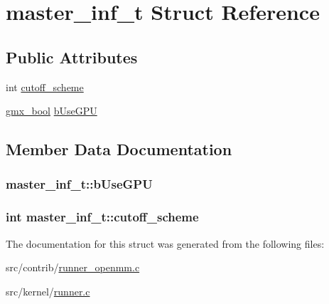 \hypertarget{structmaster__inf__t}{\section{master\-\_\-inf\-\_\-t \-Struct \-Reference}
\label{structmaster__inf__t}
}
\subsection*{\-Public \-Attributes}
\begin{DoxyCompactItemize}
\item 
int \hyperlink{structmaster__inf__t_a4c349071ca259b7096673adaf4b1058a}{cutoff\-\_\-scheme}
\item 
\hyperlink{include_2types_2simple_8h_a8fddad319f226e856400d190198d5151}{gmx\-\_\-bool} \hyperlink{structmaster__inf__t_ae53eec6d313a18c3a3f98839a1f177f1}{b\-Use\-G\-P\-U}
\end{DoxyCompactItemize}


\subsection{\-Member \-Data \-Documentation}
\hypertarget{structmaster__inf__t_ae53eec6d313a18c3a3f98839a1f177f1}{
\subsubsection[{b\-Use\-G\-P\-U}]{ {\bf master\-\_\-inf\-\_\-t\-::b\-Use\-G\-P\-U}}}\label{structmaster__inf__t_ae53eec6d313a18c3a3f98839a1f177f1}
\hypertarget{structmaster__inf__t_a4c349071ca259b7096673adaf4b1058a}{
\subsubsection[{cutoff\-\_\-scheme}]{\setlength{\rightskip}{0pt plus 5cm}int {\bf master\-\_\-inf\-\_\-t\-::cutoff\-\_\-scheme}}}\label{structmaster__inf__t_a4c349071ca259b7096673adaf4b1058a}


\-The documentation for this struct was generated from the following files\-:\begin{DoxyCompactItemize}
\item 
src/contrib/\hyperlink{runner__openmm_8c}{runner\-\_\-openmm.\-c}\item 
src/kernel/\hyperlink{runner_8c}{runner.\-c}\end{DoxyCompactItemize}
